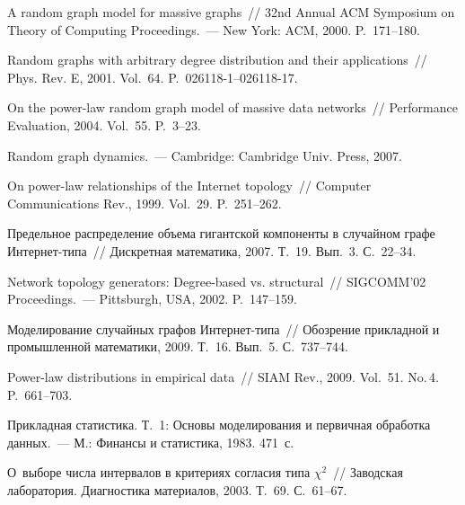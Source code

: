 \begin{multicols}{2}
{\small\frenchspacing
{%
\begin{thebibliography}{99}

 A random graph
model for massive graphs~// 32nd Annual ACM Symposium
on Theory of Computing Proceedings.~--- New York: ACM, 2000. P.~171--180.


Random graphs with arbitrary degree distribution and their
applications~// Phys. Rev. E, 2001. Vol.~64. P.~026118-1--026118-17.

On the power-law random
graph model of massive data networks~// Performance Evaluation,
2004. Vol.~55. P.~3--23.

 Random graph dynamics.~--- Cambridge: Cambridge Univ.
Press, 2007.

On power-law relationships of the Internet topology~// Computer
Communications Rev., 1999. Vol.~29. P.~251--262.

 Предельное распределение объема
гигантской компоненты в случайном графе Интернет-ти\-па~// Дискретная
математика, 2007. Т.~19. Вып.~3. С.~22--34.

Network topology generators: Degree-based
vs. structural~// SIGCOMM'02 Proceedings.~--- Pittsburgh, USA,
2002. P.~147--159.

 Моделирование случайных
графов Ин\-тер\-нет-ти\-па~// Обозрение прикладной и промышленной
математики, 2009. Т.~16. Вып.~5. С.~737--744.

Power-law distributions in empirical data~// SIAM Rev., 2009.
Vol.~51. No.\,4. P.~661--703.

Прикладная статистика. Т.~1: Основы моделирования и первичная
обработка данных.~--- М.: Финансы и статистика, 1983. 471~с.

\label{end\stat}

 О~выборе числа
интервалов в критериях согласия типа $\chi^2$~// Заводская
лаборатория. Диагностика материалов, 2003. Т.~69. С.~61--67.
 \end{thebibliography}
}
}


\end{multicols}       
